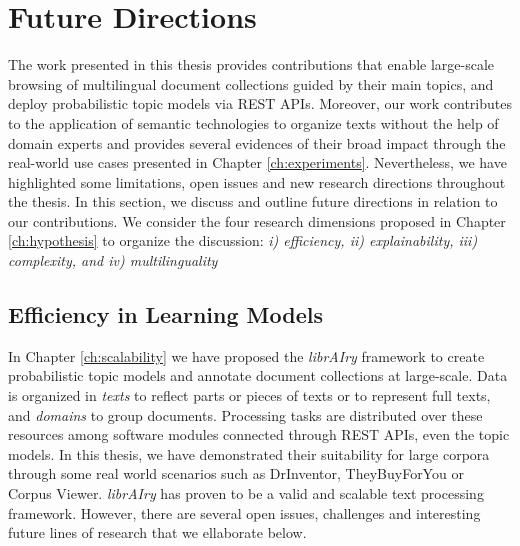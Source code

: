 \section{Future Directions}

The work presented in this thesis provides contributions that enable large-scale browsing of multilingual document collections guided by their main topics, and deploy probabilistic topic models via REST APIs. Moreover, our work contributes to the application of semantic technologies to organize texts without the help of domain experts and provides several evidences of their broad impact through the real-world use cases presented in Chapter \ref{ch:experiments}. Nevertheless, we have highlighted some limitations, open issues and new research directions throughout the thesis. In this section, we discuss and outline future directions in relation to our contributions. We consider the four research dimensions proposed in Chapter \ref{ch:hypothesis} to organize the discussion: \textit{i) efficiency, ii) explainability, iii) complexity, and iv) multilinguality}



\subsection{Efficiency in Learning Models}

In Chapter \ref{ch:scalability} we have proposed the \textit{librAIry} framework to create probabilistic topic models and annotate document collections at large-scale. Data is organized in \textit{texts} to reflect parts or pieces of texts or to represent full texts, and \textit{domains} to group documents. Processing tasks are distributed over these resources among software modules connected through REST APIs, even the topic models. In this thesis, we have demonstrated their suitability for large corpora through some real world scenarios such as DrInventor, TheyBuyForYou or Corpus Viewer. \textit{librAIry} has proven to be a valid and scalable text processing framework. However, there are several open issues, challenges and interesting future lines of research that we ellaborate below.


